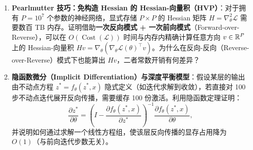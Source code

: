 
\begin{enumerate}
  \item[\textbf{5.1.7}] \textbf{Pearlmutter 技巧：免构造 Hessian 的 Hessian-向量积（HVP）}：对于拥有 $P = 10^7$ 个参数的神经网络，显式存储 $P \times P$ 的 Hessian 矩阵 $H = \nabla^2_\theta \mathcal{L}$ 需要数百 TB 内存。证明借助\textbf{一次反向模式 + 一次前向模式}（Forward-over-Reverse），可以在 $O(\operatorname{Cost}(\mathcal{L}))$ 时间与内存内精确计算任意方向 $v \in \mathbb{R}^P$ 上的 Hessian-向量积 $Hv = \nabla_\theta (\nabla_\theta \mathcal{L}(\theta)^\top v)$。为什么在反向-反向（Reverse-over-Reverse）模式下也能算出 $Hv$，二者常数开销有何差异？

  \item[\textbf{5.1.8}] \textbf{隐函数微分（Implicit Differentiation）与深度平衡模型}：假设某层的输出由不动点方程 $z^* = f_\theta(z^*, x)$ 隐式定义（如迭代求解到收敛），若直接对 100 步不动点迭代展开反向传播，需要缓存 100 份激活。利用隐函数定理证明：
  \[
    \frac{\partial z^*}{\partial \theta} = \left(I - \frac{\partial f_\theta(z^*, x)}{\partial z^*}\right)^{-1} \frac{\partial f_\theta(z^*, x)}{\partial \theta},
  \]
  并说明如何通过求解一个线性方程组，使该层反向传播的显存占用降为 $O(1)$（与前向迭代步数无关）。
\end{enumerate}
